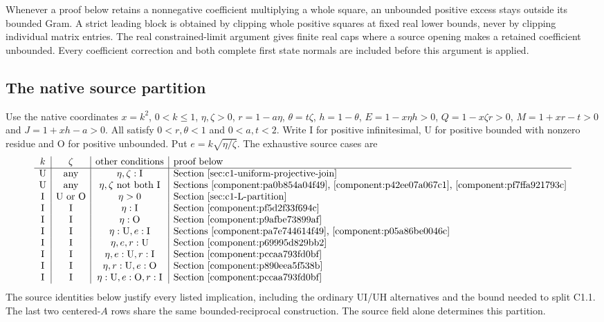 Whenever a proof below retains a nonnegative coefficient multiplying
a whole square, an unbounded positive excess stays outside its bounded
Gram. A strict leading block is obtained by clipping whole positive
squares at fixed real lower bounds, never by clipping individual
matrix entries. The real constrained-limit argument gives finite real
caps where a source opening makes a retained coefficient unbounded.
Every coefficient correction and both complete first state normals
are included before this argument is applied.

\subsection{The native source partition}
\label{sec:c1-source-partition}
\label{component:pfd0dd7bb10cf}

Use the native coordinates $x=k^2$, $0<k\le1$,
$\eta,\zeta>0$, $r=1-a\eta$, $\theta=t\zeta$, $h=1-\theta$,
$E=1-x\eta h>0$, $Q=1-x\zeta r>0$,
$M=1+xr-t>0$ and $J=1+xh-a>0$.
All satisfy $0<r,\theta<1$ and $0<a,t<2$.
Write I for positive infinitesimal, U for positive bounded with nonzero
residue and O for positive unbounded. Put $e=k\sqrt{\eta/\zeta}$.
The exhaustive source cases are
\[
\begin{array}{c|c|c|l}
k&\zeta&\text{other conditions}&\text{proof below}\\\hline
\mathrm U&\text{any}&\eta,\zeta:\mathrm I&\text{Section~\ref{sec:c1-uniform-projective-join}}\\
\mathrm U&\text{any}&\eta,\zeta\text{ not both I}&\text{Sections~\ref{component:pa0b854a04f49}, \ref{component:p42ee07a067c1}, \ref{component:pf7ffa921793c}}\\
\mathrm I&\mathrm U\text{ or }\mathrm O&\eta>0&\text{Section~\ref{sec:c1-L-partition}}\\
\mathrm I&\mathrm I&\eta:\mathrm I&\text{Section~\ref{component:pf5d2f33f694c}}\\
\mathrm I&\mathrm I&\eta:\mathrm O&\text{Section~\ref{component:p9afbe73899af}}\\
\mathrm I&\mathrm I&\eta:\mathrm U,e:\mathrm I&\text{Sections~\ref{component:pa7e744614f49}, \ref{component:p05a86be0046c}}\\
\mathrm I&\mathrm I&\eta,e,r:\mathrm U&\text{Section~\ref{component:p69995d829bb2}}\\
\mathrm I&\mathrm I&\eta,e:\mathrm U,r:\mathrm I&\text{Section~\ref{component:pccaa793fd0bf}}\\
\mathrm I&\mathrm I&\eta,r:\mathrm U,e:\mathrm O&\text{Section~\ref{component:p890eea5f538b}}\\
\mathrm I&\mathrm I&\eta:\mathrm U,e:\mathrm O,r:\mathrm I&\text{Section~\ref{component:pccaa793fd0bf}}
\end{array}
\]
The source identities below justify every listed implication, including
the ordinary UI/UH alternatives and the bound needed to split C1.1.
The last two centered-$A$ rows share the same bounded-reciprocal
construction. The source field alone determines this partition.

